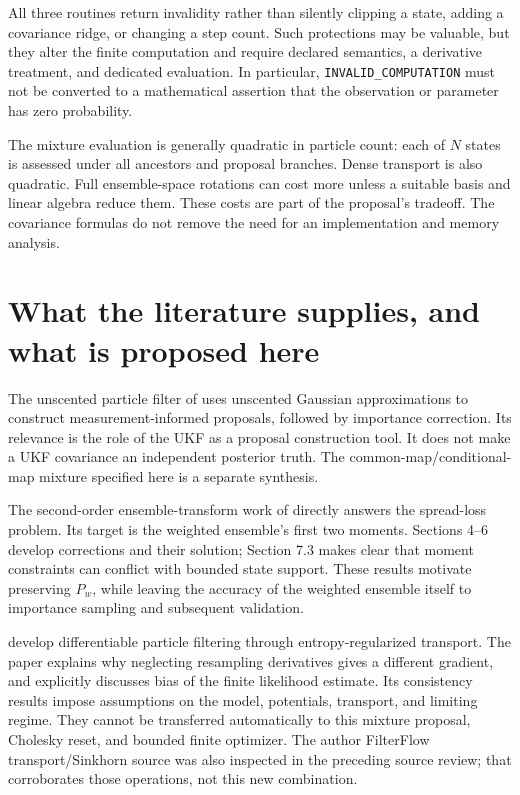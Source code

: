 All three routines return invalidity rather than silently clipping a state,
adding a covariance ridge, or changing a step count. Such protections may be
valuable, but they alter the finite computation and require declared
semantics, a derivative treatment, and dedicated evaluation. In particular,
\texttt{INVALID\_COMPUTATION} must not be converted to a mathematical assertion
that the observation or parameter has zero probability.

The mixture evaluation is generally quadratic in particle count: each of
\(N\) states is assessed under all ancestors and proposal branches.
Dense transport is also quadratic. Full ensemble-space rotations can cost
more unless a suitable basis and linear algebra reduce them. These costs
are part of the proposal's tradeoff. The covariance formulas do not remove
the need for an implementation and memory analysis.

\section[Literature and proposed extensions]{What the literature supplies, and what is proposed here}

The unscented particle filter of \citet{vandermerwe2000unscented} uses unscented
Gaussian approximations to construct measurement-informed proposals,
followed by importance correction. Its relevance is the role of the UKF
as a proposal construction tool. It does not make a UKF covariance an
independent posterior truth. The common-map/conditional-map mixture
specified here is a separate synthesis.

The second-order ensemble-transform work of \citet{acevedodewiljesreich2017secondorder} directly
answers the spread-loss problem. Its target is the weighted ensemble's
first two moments. Sections 4--6 develop corrections and their solution;
Section 7.3 makes clear that moment constraints can conflict with bounded
state support. These results motivate preserving \(P_w\), while leaving
the accuracy of the weighted ensemble itself to importance sampling and
subsequent validation.

\citet[Algorithm 3, Section 4 and Proposition 4.3]{corenflos2021differentiable} develop
differentiable particle filtering through entropy-regularized transport.
The paper explains why neglecting resampling derivatives gives a different
gradient, and explicitly discusses bias of the finite likelihood estimate.
Its consistency results impose assumptions on the model, potentials,
transport, and limiting regime. They cannot be transferred automatically
to this mixture proposal, Cholesky reset, and bounded finite optimizer.
The author FilterFlow transport/Sinkhorn source was also inspected in the
preceding source review; that corroborates those operations, not this new
combination.

